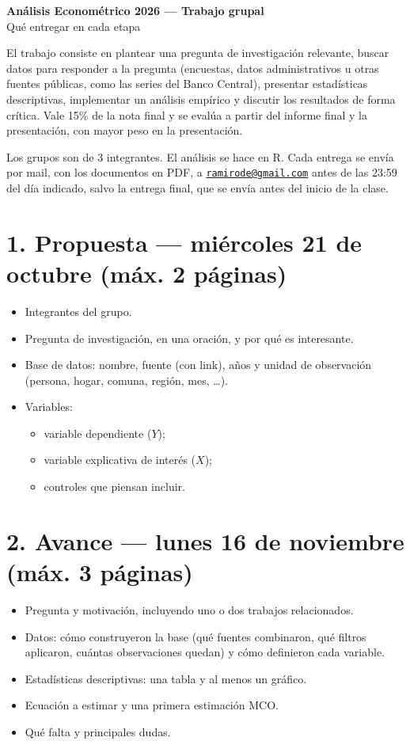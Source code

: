 \documentclass[letterpaper,11pt]{article}
\begin{document}
\begin{center}
{\large\bfseries\sffamily Análisis Econométrico 2026 --- Trabajo grupal}\\[4pt]
{\sffamily Qué entregar en cada etapa}
\end{center}

El trabajo consiste en plantear una pregunta de investigación relevante, buscar datos para responder a la pregunta (encuestas, datos administrativos u otras fuentes públicas, como las series del Banco Central), presentar estadísticas descriptivas, implementar un análisis empírico y discutir los resultados de forma crítica. Vale 15\% de la nota final y se evalúa a partir del informe final y la presentación, con mayor peso en la presentación.

Los grupos son de 3 integrantes. El análisis se hace en R. Cada entrega se envía por mail, con los documentos en PDF, a \href{mailto:ramirode@gmail.com}{\texttt{ramirode@gmail.com}} antes de las 23:59 del día indicado, salvo la entrega final, que se envía antes del inicio de la clase.

\section*{1. Propuesta --- miércoles 21 de octubre (máx. 2 páginas)}
\begin{itemize}
  \item Integrantes del grupo.
  \item Pregunta de investigación, en una oración, y por qué es interesante.
  \item Base de datos: nombre, fuente (con link), años y unidad de observación (persona, hogar, comuna, región, mes, \ldots).
  \item Variables:
  \begin{itemize}
    \item variable dependiente ($Y$);
    \item variable explicativa de interés ($X$);
    \item controles que piensan incluir.
  \end{itemize}
\end{itemize}

\section*{2. Avance --- lunes 16 de noviembre (máx. 3 páginas)}
\begin{itemize}
  \item Pregunta y motivación, incluyendo uno o dos trabajos relacionados.
  \item Datos: cómo construyeron la base (qué fuentes combinaron, qué filtros aplicaron, cuántas observaciones quedan) y cómo definieron cada variable.
  \item Estadísticas descriptivas: una tabla y al menos un gráfico.
  \item Ecuación a estimar y una primera estimación MCO.
  \item Qué falta y principales dudas.
\end{itemize}
\end{document}
